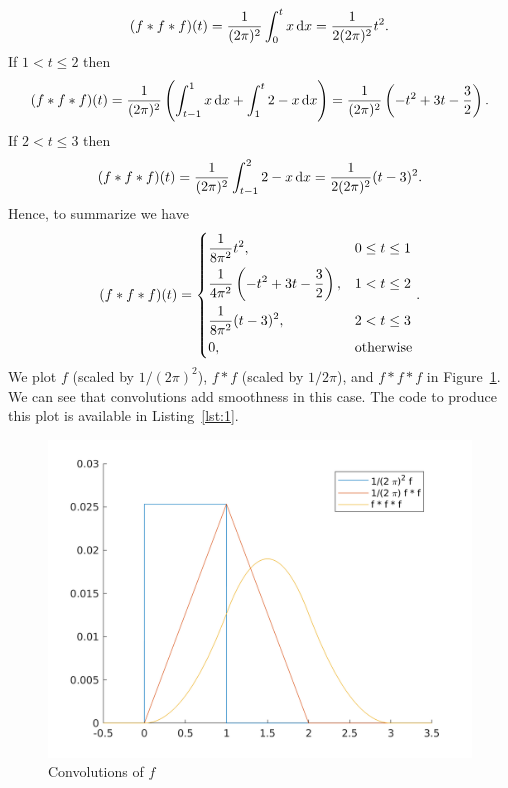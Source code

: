 \documentclass{article}
\begin{document}
%
\begin{equation*}
    (f * f * f)(t)
        = \frac{1}{(2 \pi)^2} \int_{0}^t x \dif x
        = \frac{1}{2 (2 \pi)^2} t^2
        .
\end{equation*}
%
If $1 < t \leq 2$ then
%
\begin{equation*}
    (f * f * f)(t)
        =
        \frac{1}{(2 \pi)^2}
        \del{
            \int_{t - 1}^1 x \dif x
            +
            \int_{1}^t 2 - x \dif x
        }
        =
        \frac{1}{(2 \pi)^2}
        \del{
            - t^2 + 3 t - \frac{3}{2}
        }
        .
\end{equation*}
%
If $2 < t \leq 3$ then
%
\begin{equation*}
    (f * f * f)(t)
        =
        \frac{1}{(2 \pi)^2}
        \int_{t - 1}^2 2 - x \dif x
        =
        \frac{1}{2 (2 \pi)^2}
        (t - 3)^2
        .
\end{equation*}
%
Hence, to summarize we have
%
\begin{equation*}
    (f * f * f)(t)
        =
        \begin{dcases}
            \frac{1}{8 \pi^2} t^2, & 0 \leq t \leq 1 \\
            \frac{1}{4 \pi^2}
            \del{
                - t^2 + 3 t - \frac{3}{2}
            }, & 1 < t \leq 2 \\
            \frac{1}{8 \pi^2}
            (t - 3)^2, & 2 < t \leq 3 \\
            0, & \text{otherwise}
        \end{dcases}
        .
\end{equation*}
%
We plot $f$ (scaled by $1 / (2 \pi)^2$), $f * f$ (scaled by
$1 / 2 \pi$), and $f * f * f$ in Figure~\ref{fig:4-8}. We can see that
convolutions add smoothness in this case. The code to produce this plot
is available in Listing~\ref{lst:1}.

\begin{figure}[!ht]
    \includegraphics[width=5in]{q48}
    \centering
    \caption{Convolutions of $f$}
    \label{fig:4-8}
\end{figure}
\end{document}
